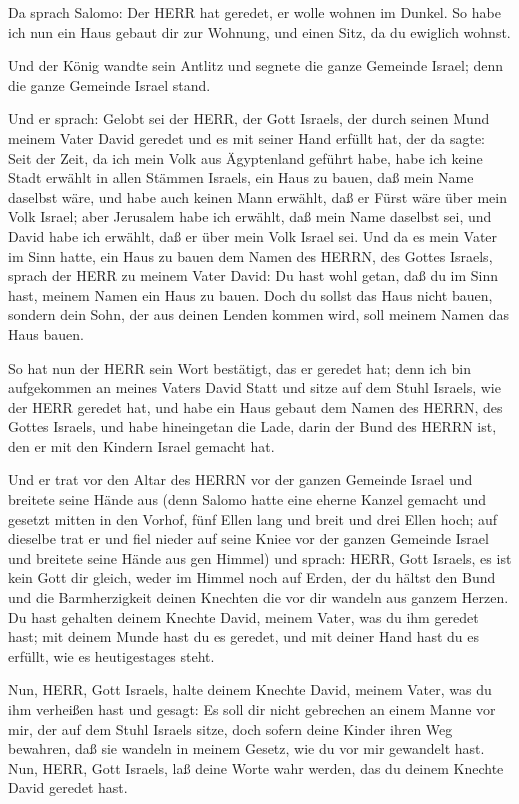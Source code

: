  Da sprach Salomo: Der HERR hat geredet, er wolle wohnen im
Dunkel.  So habe ich nun ein Haus gebaut dir zur Wohnung,
und einen Sitz, da du ewiglich wohnst.

 Und der König wandte sein Antlitz und segnete die ganze
Gemeinde Israel; denn die ganze Gemeinde Israel stand.

 Und er sprach: Gelobt sei der HERR, der Gott Israels, der
durch seinen Mund meinem Vater David geredet und es mit seiner Hand
erfüllt hat, der da sagte:  Seit der Zeit, da ich mein Volk
aus Ägyptenland geführt habe, habe ich keine Stadt erwählt in allen
Stämmen Israels, ein Haus zu bauen, daß mein Name daselbst wäre, und
habe auch keinen Mann erwählt, daß er Fürst wäre über mein Volk Israel;
 aber Jerusalem habe ich erwählt, daß mein Name daselbst
sei, und David habe ich erwählt, daß er über mein Volk Israel sei.
 Und da es mein Vater im Sinn hatte, ein Haus zu bauen dem
Namen des HERRN, des Gottes Israels,  sprach der HERR zu
meinem Vater David: Du hast wohl getan, daß du im Sinn hast, meinem
Namen ein Haus zu bauen.  Doch du sollst das Haus nicht
bauen, sondern dein Sohn, der aus deinen Lenden kommen wird, soll meinem
Namen das Haus bauen.

 So hat nun der HERR sein Wort bestätigt, das er geredet
hat; denn ich bin aufgekommen an meines Vaters David Statt und sitze auf
dem Stuhl Israels, wie der HERR geredet hat, und habe ein Haus gebaut
dem Namen des HERRN, des Gottes Israels,  und habe
hineingetan die Lade, darin der Bund des HERRN ist, den er mit den
Kindern Israel gemacht hat.

 Und er trat vor den Altar des HERRN vor der ganzen
Gemeinde Israel und breitete seine Hände aus  (denn Salomo
hatte eine eherne Kanzel gemacht und gesetzt mitten in den Vorhof, fünf
Ellen lang und breit und drei Ellen hoch; auf dieselbe trat er und fiel
nieder auf seine Kniee vor der ganzen Gemeinde Israel und breitete seine
Hände aus gen Himmel)  und sprach: HERR, Gott Israels, es
ist kein Gott dir gleich, weder im Himmel noch auf Erden, der du hältst
den Bund und die Barmherzigkeit deinen Knechten die vor dir wandeln aus
ganzem Herzen.  Du hast gehalten deinem Knechte David,
meinem Vater, was du ihm geredet hast; mit deinem Munde hast du es
geredet, und mit deiner Hand hast du es erfüllt, wie es heutigestages
steht.

 Nun, HERR, Gott Israels, halte deinem Knechte David,
meinem Vater, was du ihm verheißen hast und gesagt: Es soll dir nicht
gebrechen an einem Manne vor mir, der auf dem Stuhl Israels sitze, doch
sofern deine Kinder ihren Weg bewahren, daß sie wandeln in meinem
Gesetz, wie du vor mir gewandelt hast.  Nun, HERR, Gott
Israels, laß deine Worte wahr werden, das du deinem Knechte David
geredet hast.

